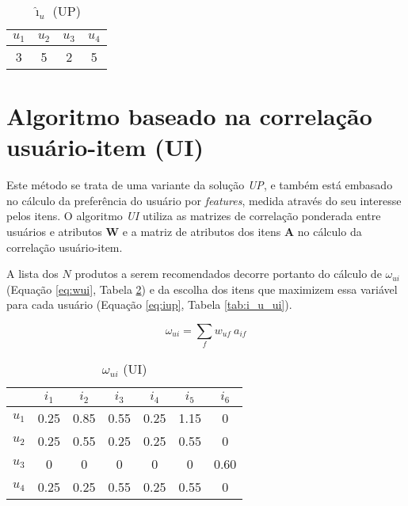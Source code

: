 \begin{table}[p]
\begin{center}
    \caption{$\hat{\imath}_u$ (UP)}
    \label{tab:i_u}
    \begin{tabular}{ | c | c | c | c | } 
    \hline
     $u_1$ & $u_2$ & $u_3$ & $u_4$   \\ \hline
     3 & 5 & 2 & 5  \\ \hline
    \end{tabular}
\end{center}
\end{table}

\section{Algoritmo baseado na correlação usuário-item (UI)} %
\label{sec:algoritmo_baseado_na_correla_o_usu_rio_item_ui_}

Este método se trata de uma variante da solução \textit{UP}, e também está embasado no cálculo da preferência do usuário por \textit{features}, medida através do seu interesse pelos itens. O algoritmo \textit{UI} utiliza as matrizes de correlação ponderada entre usuários e atributos $\mathbf{W}$ e a matriz de atributos dos itens $\mathbf{A}$ no cálculo da correlação usuário-item.

A lista dos $N$ produtos a serem recomendados decorre portanto do cálculo de $\omega_{ui}$ (Equação \ref{eq:wui}, Tabela \ref{tab:omega_ui_ui}) e da escolha dos itens que maximizem essa variável para cada usuário (Equação \ref{eq:iup}, Tabela \ref{tab:i_u_ui}).

\begin{equation}
\label{eq:wui} 
    \omega_{ui} = \sum_{f}{w_{uf}~a_{if}}
\end{equation} 


\begin{table}[p]
\begin{center}
    \caption{$\omega_{ui}$ (UI)}
    \label{tab:omega_ui_ui}
    \begin{tabular}{ | c | c | c | c | c | c | c | } 
    \hline
     & $i_1$ & $i_2$ & $i_3$ & $i_4$ & $i_5$ & $i_6$ \\ \hline
     $u_1$ & 0.25 & 0.85 & 0.55 & 0.25 & 1.15 & 0 \\ \hline
     $u_2$ & 0.25 & 0.55 & 0.25 & 0.25 & 0.55 & 0 \\ \hline
     $u_3$ & 0    & 0    & 0    & 0    & 0    & 0.60 \\ \hline
     $u_4$ & 0.25 & 0.25 & 0.55 & 0.25 & 0.55 & 0 \\ \hline
    \end{tabular}
\end{center}
\end{table}


